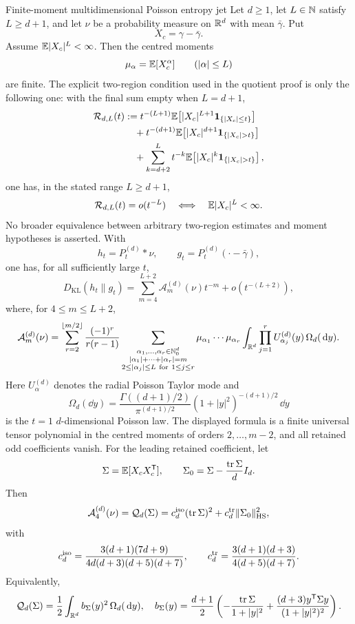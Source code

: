 \begin{maintheorem}{Finite-moment multidimensional Poisson entropy jet}
\label{thm:main-B}
Let \(d\ge1\), let \(L\in\mathbb{N}\) satisfy \(L\ge d+1\), and let \(\nu\) be a
probability measure on \(\mathbb{R}^d\) with mean \(\bar\gamma\).  Put
\[
X_c=\gamma-\bar\gamma .
\]
Assume \(\mathbb{E} |X_c|^L<\infty\).  Then the centred moments
\[
\mu_\alpha=\mathbb{E}[X_c^\alpha]\qquad(|\alpha|\le L)
\]
are finite.  The explicit two-region condition used in the quotient proof is
only the following one: with the final sum empty when \(L=d+1\),
\[
\begin{aligned}
\mathcal R_{d,L}(t)
&:=t^{-(L+1)}\EE\!\left[
|X_c|^{L+1}{\bf1}_{\{|X_c|\le t\}}\right] \\
&\quad{}+ t^{-(d+1)}\EE\!\left[
|X_c|^{d+1}{\bf1}_{\{|X_c|>t\}}\right] \\
&\quad{}+ \sum_{k=d+2}^{L}t^{-k}\EE\!\left[
|X_c|^k{\bf1}_{\{|X_c|>t\}}\right],
\end{aligned}
\]
one has, in the stated range \(L\ge d+1\),
\[
\mathcal R_{d,L}(t)=o(t^{-L})
\quad\Longleftrightarrow\quad
\mathbb{E} |X_c|^L<\infty .
\]
No broader equivalence between arbitrary two-region estimates and moment
hypotheses is asserted.  With
\[
h_t=P_t^{(d)}*\nu,\qquad
g_t=P_t^{(d)}(\cdot-\bar\gamma),
\]
one has, for all sufficiently large \(t\),
\[
D_{\mathrm{KL}}(h_t\|g_t)
=\sum_{m=4}^{L+2}\mathcal A_m^{(d)}(\nu)t^{-m}
+o(t^{-(L+2)}),
\]
where, for \(4\le m\le L+2\),
\[
\mathcal A_m^{(d)}(\nu)=
\sum_{r=2}^{\lfloor m/2\rfloor}
\frac{(-1)^r}{r(r-1)}
\sum_{\substack{\alpha_1,\ldots,\alpha_r\in\mathbb{N}_0^d\\
|\alpha_1|+\cdots+|\alpha_r|=m\\
2\le|\alpha_j|\le L\ \mathrm{for}\ 1\le j\le r}}
\mu_{\alpha_1}\cdots\mu_{\alpha_r}
\int_{\mathbb{R}^d}\prod_{j=1}^r
U_{\alpha_j}^{(d)}(y)\,\Omega_d(\,\mathrm{d} y).
\]
Here \(U_\alpha^{(d)}\) denotes the radial Poisson Taylor mode and
\[
\Omega_d(\dd y)
=\frac{\Gamma((d+1)/2)}{\pi^{(d+1)/2}}
(1+|y|^2)^{-(d+1)/2}\,\dd y
\]
is the \(t=1\) \(d\)-dimensional Poisson law.  The displayed formula is a
finite universal tensor polynomial in the centred moments of orders
\(2,\ldots,m-2\), and all retained odd coefficients vanish.
For the leading retained coefficient, let
\[
\Sigma=\mathbb{E}[X_cX_c^{\mathsf T}],\qquad
\Sigma_0=\Sigma-\frac{\operatorname{tr}\Sigma}{d}I_d .
\]
Then
\[
\mathcal A_4^{(d)}(\nu)=\mathcal Q_d(\Sigma)
=c_d^{\rm iso}(\operatorname{tr}\Sigma)^2
+c_d^{\rm tr}\|\Sigma_0\|_{\rm HS}^2,
\]
with
\[
c_d^{\rm iso}=
\frac{3(d+1)(7d+9)}
{4d(d+3)(d+5)(d+7)},
\qquad
c_d^{\rm tr}=
\frac{3(d+1)(d+3)}
{4(d+5)(d+7)} .
\]
Equivalently,
\[
\mathcal Q_d(\Sigma)
=\frac12\int_{\mathbb{R}^d}b_\Sigma(y)^2\,\Omega_d(\,\mathrm{d} y),
\quad
b_\Sigma(y)=
\frac{d+1}{2}\left(
-\frac{\operatorname{tr}\Sigma}{1+|y|^2}
+\frac{(d+3)y^{\mathsf T}\Sigma y}{(1+|y|^2)^2}
\right).
\]
\end{maintheorem}

